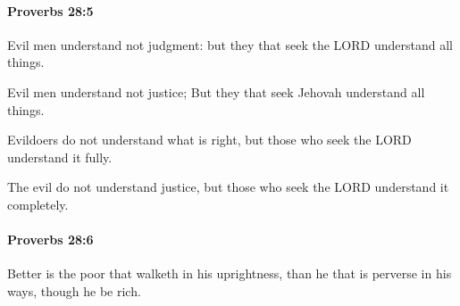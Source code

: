 		\paragraph{Proverbs 28:5} %
			\label{PROVERBS-28-5}

			Evil men understand not judgment: but they that seek the LORD understand all things.

			\begin{versebox}
					\item[BHS] 
					\item[ASV] Evil men understand not justice; But they that seek Jehovah understand all things.
					\item[NIV] Evildoers do not understand what is right, but those who seek the LORD understand it fully.
					\item[NRSV] The evil do not understand justice, but those who seek the LORD understand it completely.
			\end{versebox}

		\paragraph{Proverbs 28:6} %
			\label{PROVERBS-28-6}

			Better is the poor that walketh in his uprightness, than he that is perverse in his ways, though he be rich.

